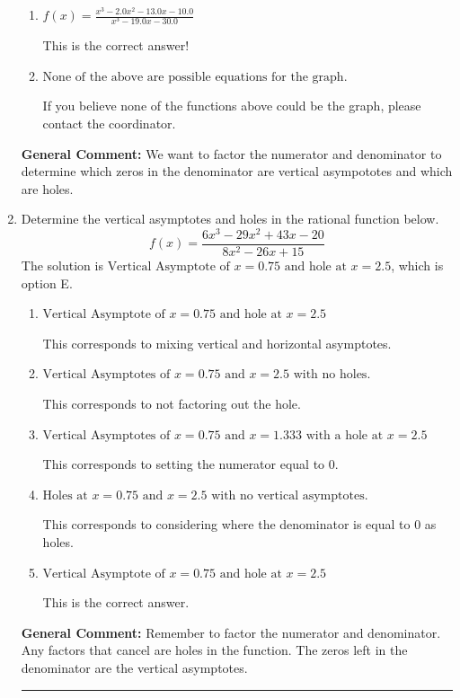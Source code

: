 \documentclass{extbook}[14pt]
\newcommand{\litem}[1]{\item #1

\rule{\textwidth}{0.4pt}}
\begin{document}
\begin{enumerate}
{\begin{enumerate}[label=\Alph*.]
You treated all of the zeros in the denominator as vertical asmptotes when some of them were holes and wrote factors as $x+z$.
\item \( f(x)=\frac{x^{3} -2.0 x^{2} -13.0 x -10.0}{x^{3} -19.0 x -30.0} \)

This is the correct answer!
\item \( \text{None of the above are possible equations for the graph.} \)

If you believe none of the functions above could be the graph, please contact the coordinator.
\end{enumerate}

\textbf{General Comment:} We want to factor the numerator and denominator to determine which zeros in the denominator are vertical asympototes and which are holes.
}
\litem{
Determine the vertical asymptotes and holes in the rational function below.
\[ f(x) = \frac{6x^{3} -29 x^{2} +43 x -20}{8x^{2} -26 x + 15} \]The solution is \( \text{Vertical Asymptote of } x = 0.75 \text{ and hole at } x = 2.5 \), which is option E.\begin{enumerate}[label=\Alph*.]
\item \( \text{Vertical Asymptote of } x = 0.75 \text{ and hole at } x = 2.5 \)

This corresponds to mixing vertical and horizontal asymptotes.
\item \( \text{Vertical Asymptotes of } x = 0.75 \text{ and } x = 2.5 \text{ with no holes.} \)

This corresponds to not factoring out the hole.
\item \( \text{Vertical Asymptotes of } x = 0.75 \text{ and } x = 1.333 \text{ with a hole at } x = 2.5 \)

This corresponds to setting the numerator equal to 0.
\item \( \text{Holes at } x = 0.75 \text{ and } x = 2.5 \text{ with no vertical asymptotes.} \)

This corresponds to considering where the denominator is equal to 0 as holes.
\item \( \text{Vertical Asymptote of } x = 0.75 \text{ and hole at } x = 2.5 \)

This is the correct answer.
\end{enumerate}

\textbf{General Comment:} Remember to factor the numerator and denominator. Any factors that cancel are holes in the function. The zeros left in the denominator are the vertical asymptotes.
}
\end{enumerate}
\end{document}
